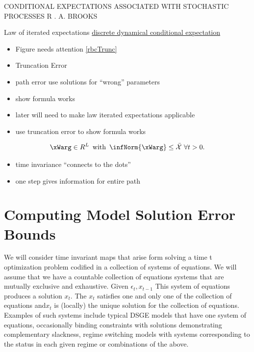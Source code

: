 \documentclass[12pt]{article}
\begin{document}
CONDITIONAL EXPECTATIONS ASSOCIATED WITH STOCHASTIC PROCESSES
R . A. BROOKS

Law of iterated expectations
\href{http://www.pnas.org/content/103/11/3968.full}{discrete dynamical conditional expectation} 
\label{sec:simple-rbc-model-2}

\begin{itemize}
\item Figure needs attention  \ref{rbcTrunc}
\item Truncation Error
\item path error use solutions for ``wrong'' parameters
\item show formula works
\item later will need to make law iterated expectations applicable
\item use truncation error to show formula works
\end{itemize}


 \begin{gather}
   \xWarg \in{R^L}\,\text{ with }\,\infNorm{\xWarg}  \le \bar{\mathcal{X}}\,\,\forall t> 0 \label{fFamily}.
 \end{gather}

 \begin{itemize}
 \item time invariance ``connects to the dots''  
 \item one step gives information for entire path
 \end{itemize}


\section{Computing Model Solution Error Bounds}
\label{sec:solnerrorbounds}

We will consider time invariant maps that arise form solving a time t optimization problem codified in a collection of systems of equations.  We will assume that we have a countable collection of equations systems that are mutually exclusive and exhaustive.  Given $\epsilon_t, x_{t-1}$  This system of equations produces a solution $x_t$.  The $x_t$ satisfies one and only one of the collection of equations and$x_t$ is (locally) the unique solution for the collection of
equations.  Examples of such systems include typical DSGE models that have one
system of equations, occasionally binding constraints with solutions demonstrating complementary slackness, regime switching models with systems corresponding to the status in each given regime or combinations of the above.
\end{document}
